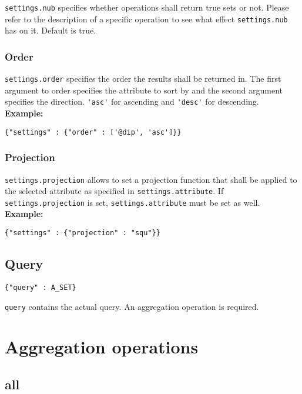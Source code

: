 \documentclass[a4paper]{article}
\begin{document}
\verb|settings.nub| specifies whether operations shall return true sets or not. Please refer to the description of a specific
operation to see what effect \verb|settings.nub| has on it. Default is true.

\subsubsection{Order}

\verb|settings.order| specifies the order the results shall be
returned in. The first argument to order specifies the attribute to
sort by and the second argument specifies the direction.
\verb|'asc'| for ascending and \verb|'desc'| for descending.\\

\textbf{Example:}
\begin{verbatim}
{"settings" : {"order" : ['@dip', 'asc']}}
\end{verbatim}

\subsubsection{Projection}

\verb|settings.projection| allows to set a projection function that
shall be applied to the selected attribute as specified in
\verb|settings.attribute|. If \verb|settings.projection| is set,
\verb|settings.attribute| must be set as well. \\

\textbf{Example:}
\begin{verbatim}
{"settings" : {"projection" : "squ"}}
\end{verbatim}

\subsection{Query}

\begin{verbatim}
{"query" : A_SET}
\end{verbatim}

\verb|query| contains the actual query. An aggregation operation is required.

\section{Aggregation operations}

\subsection{all}
\end{document}

